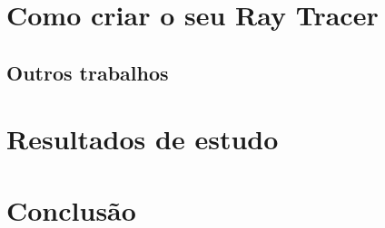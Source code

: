 \documentclass[journal]{IEEEtran}
\begin{document}
\section{Como criar o seu Ray Tracer}

\subsection{Outros trabalhos}

\section{Resultados de estudo}

\section{Conclusão}






\end{document}
